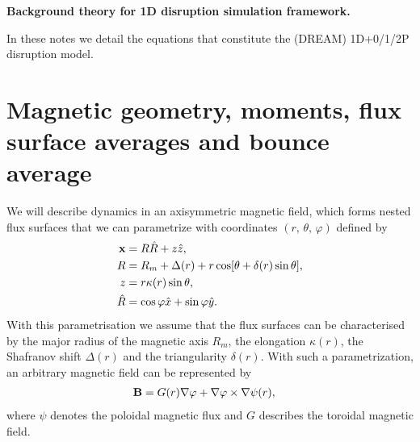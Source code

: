 \documentclass[11pt,a4paper]{article}
\renewcommand{\b}[1]{\ensuremath{ {\bf #1 } }}
\begin{document}
\begin{center}
\Large \bf Background theory for 1D disruption simulation framework.
\end{center}

\vspace{10mm}

In these notes we detail the equations that constitute the (DREAM) 1D+0/1/2P disruption model. 


\tableofcontents



\section{Magnetic geometry, moments, flux surface averages and bounce average}
We will describe dynamics in an axisymmetric magnetic field, which forms nested flux surfaces that we can parametrize with coordinates $(r,\,\theta,\,\varphi)$ defined by
\begin{align}
\b{x} &= R\hat{R} + z\hat{z}, \nonumber \\
R &= R_m + \Delta(r) + r\cos[\theta +\delta(r) \sin\theta], \nonumber \\
z &= r \kappa(r) \sin\theta, \nonumber \\
\hat{R} &= \cos\varphi \hat{x} + \sin\varphi \hat{y}.
\label{eq:geometry coordinates}
\end{align}
With this parametrisation we assume that the flux surfaces can be characterised by the major radius of the magnetic axis $R_m$, the elongation $\kappa(r)$, the Shafranov shift $\Delta(r)$ and the triangularity $\delta(r)$.
With such a parametrization, an arbitrary magnetic field can be represented by
\begin{align}
\b{B} &= G(r) \nabla \varphi + \nabla \varphi \times \nabla \psi(r),
\end{align}
where $\psi$ denotes the poloidal magnetic flux and $G$ describes the toroidal magnetic field.
\end{document}
